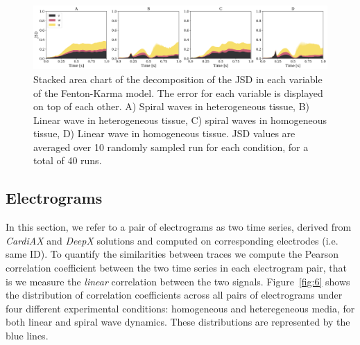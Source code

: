 \documentclass[utf8]{frontiersSCNS} %
\begin{document}
\begin{figure}[!htp]
\centering
\includegraphics[width=\textwidth]{Figure-5.png}
\caption{Stacked area chart of the decomposition of the JSD in each variable of the Fenton-Karma model. The error for each variable is displayed on top of each other. A) Spiral waves in heterogeneous tissue, B) Linear wave in heterogeneous tissue, C) spiral waves in homogeneous tissue, D) Linear wave in homogeneous tissue. JSD values are averaged over 10 randomly sampled run for each condition, for a total of 40 runs.
}
\label{fig:5}
\end{figure}


\subsection{Electrograms}
\label{sec:results:electrograms}
In this section, we refer to a pair of electrograms as two time series, derived from \textit{CardiAX} and \textit{DeepX} solutions and computed on corresponding electrodes (i.e. same ID).
To quantify the similarities between traces we compute the Pearson correlation coefficient between the two time series in each electrogram pair, that is we measure the \textit{linear} correlation between the two signals. Figure~\ref{fig:6} shows the distribution of correlation coefficients across all pairs of electrograms under four different experimental conditions: homogeneous and heteregeneous media, for both linear and spiral wave dynamics. These distributions are represented by the blue lines.
\end{document}
